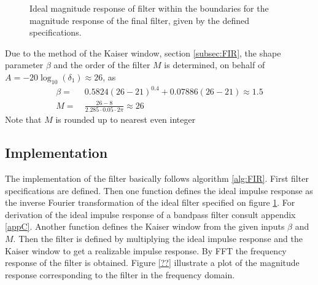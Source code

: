 \begin{figure}[H]
\centering
{}
\caption{Ideal magnitude response of filter within the boundaries for the magnitude response of the final filter, given by the defined specifications.}
\label{fig:spec_Hd}
\end{figure}

Due to the method of the Kaiser window, section \ref{subsec:FIR}, the shape parameter $\beta$ and the order of the filter $M$ is determined, on behalf of $A=-20\log_{10}(\delta_1) \approx 26 $, as  
\begin{align}
\beta =& \ 0.5824(26-21)^{0.4} + 0.07886(26-21)  \approx 1.5 \\
M =& \ \frac{26-8}{2.285 \cdot 0.05\cdot 2\pi}\approx 26 
\end{align}
Note that $M$ is rounded up to nearest even integer 
\subsection{Implementation}
The implementation of the filter basically follows algorithm \ref{alg:FIR}. First filter specifications are defined. Then one function defines the ideal impulse response as the inverse Fourier transformation of the ideal filter specified on figure \ref{fig:spec_Hd}. For derivation of the ideal impulse response of a bandpass filter consult appendix \ref{appC}. Another function defines the Kaiser window from the given inputs $\beta$ and $M$. Then the filter is defined by multiplying the ideal impulse response and the Kaiser window to get a realizable impulse response. By FFT the frequency response of the filter is obtained. Figure \ref{??} illustrate a plot of the magnitude response corresponding to the filter in the frequency domain.   

